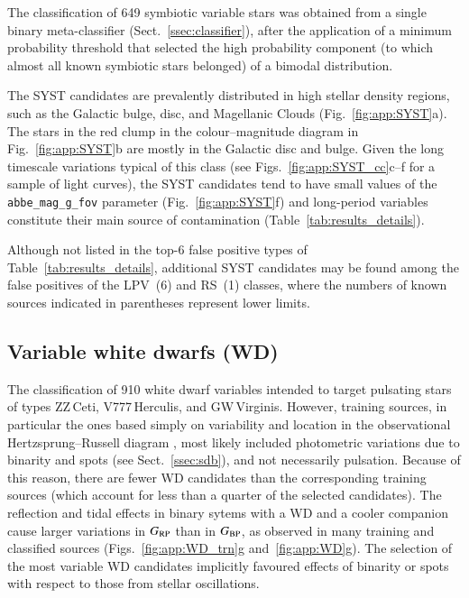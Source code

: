 \documentclass[longauth]{aa}
\def\bp{$G_{\rm BP}$\xspace}
\def\rp{$G_{\rm RP}$\xspace}
\begin{document}
The classification of 649 symbiotic variable stars was obtained from a single binary meta-classifier (Sect.~\ref{ssec:classifier}), after the application of a minimum probability threshold that selected the high probability component (to which almost all known symbiotic stars belonged) of a bimodal distribution.

The SYST candidates are prevalently distributed in high stellar density regions, such as the Galactic bulge, disc, and Magellanic Clouds (Fig.~\ref{fig:app:SYST}a).
The stars in the red clump in the colour--magnitude diagram in Fig.~\ref{fig:app:SYST}b are mostly in the Galactic disc and bulge. Given the long timescale variations typical of this class (see Figs.~\ref{fig:app:SYST_cc}c--f for a sample of light curves), the SYST candidates tend to have small values of the \texttt{abbe\_mag\_g\_fov} parameter (Fig.~\ref{fig:app:SYST}f) and long-period variables constitute their main source of contamination   (Table~\ref{tab:results_details}).

Although not listed in the top-6 false positive types of Table~\ref{tab:results_details}, additional SYST candidates may be found among the false positives of the LPV~(6) and RS~(1) classes, where the numbers of known sources indicated in parentheses represent lower limits.



\subsection{Variable white dwarfs (WD)\label{ssec:wd}}

The classification of 910 white dwarf variables intended to target pulsating stars of types ZZ\,Ceti, V777\,Herculis, and GW\,Virginis. However, training sources, in particular the ones based simply on variability and location in the observational Hertzsprung--Russell diagram \citep[such as][]{2020svos.conf...11E}, most likely included photometric variations due to binarity and spots (see Sect.~\ref{ssec:sdb}), 
and not necessarily pulsation. Because of this reason, there are fewer WD candidates than the corresponding training sources (which account for less than a quarter of the selected candidates). 
The reflection and tidal effects in binary sytems with a WD and a cooler companion cause larger variations in \rp than in \bp, as observed in many training and classified sources (Figs.~\ref{fig:app:WD_trn}g and~\ref{fig:app:WD}g). 
The selection of the most variable WD candidates implicitly favoured effects of binarity or spots with respect to those from stellar oscillations.
\end{document}
